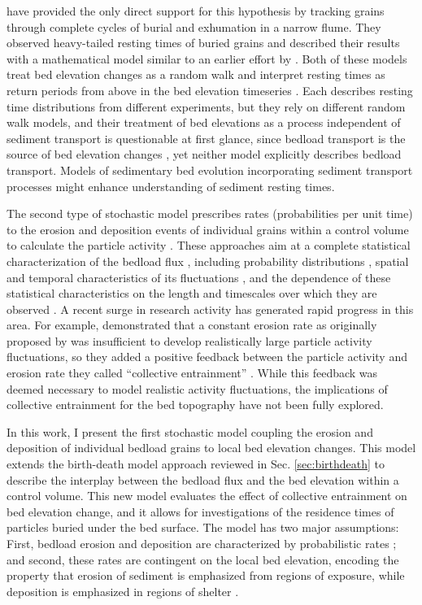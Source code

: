 \citet{Martin2014} have provided the only direct support for this hypothesis by tracking grains through complete cycles of burial and exhumation in a narrow flume.
They observed heavy-tailed resting times of buried grains and described their results with a mathematical model similar to an earlier effort by \citet{Voepel2013}.
Both of these models treat bed elevation changes as a random walk and interpret resting times as return periods from above in the bed elevation timeseries \citep{Redner2007}.
Each describes resting time distributions from different experiments, but they rely on different random walk models, and their treatment of bed elevations as a process independent of sediment transport is questionable at first glance, since bedload transport is the source of bed elevation changes \citep{Wong2007}, yet neither model explicitly describes bedload transport.
Models of sedimentary bed evolution incorporating sediment transport processes might enhance understanding of sediment resting times.

The second type of stochastic model prescribes rates (probabilities per unit time) to the erosion and deposition events of individual grains within a control volume to calculate the particle activity \citep{Einstein1950}.
These approaches aim at a complete statistical characterization of the bedload flux \citep{Furbish2012a,Fathel2015,Furbish2017,Heyman2016}, including probability distributions \citep{Ancey2006,Ancey2008}, spatial and temporal characteristics of its fluctuations \citep{Heyman2014a, Roseberry2012,Dhont2018}, and the dependence of these statistical characteristics on the length and timescales over which they are observed \citep{Singh2009,Singh2012,Saletti2015}.
A recent surge in research activity has generated rapid progress in this area. 
For example, \citet{Ancey2006} demonstrated that a constant erosion rate as originally proposed by \citet{Einstein1950} was insufficient to develop realistically large particle activity fluctuations, so they added a positive feedback between the particle activity and erosion rate they called ``collective entrainment'' \citep{Ancey2008, Heyman2013,Heyman2014, Lee2018}.
While this feedback was deemed necessary to model realistic activity fluctuations, the implications of collective entrainment for the bed topography have not been fully explored.

In this work, I present the first stochastic model coupling the erosion and deposition of individual bedload grains to local bed elevation changes.
This model extends the birth-death model approach reviewed in Sec. \ref{sec:birthdeath} to describe the interplay between the bedload flux and the bed elevation within a control volume.
This new model evaluates the effect of collective entrainment on bed elevation change, and it allows for investigations of the residence times of particles buried under the bed surface.
The model has two major assumptions: First, bedload erosion and deposition are characterized by probabilistic rates \citep{Einstein1950, Ancey2008}; and second, these rates are contingent on the local bed elevation, encoding the property that erosion of sediment is emphasized from regions of exposure, while deposition is emphasized in regions of shelter \citep{Sawai1987, Wong2007}.

